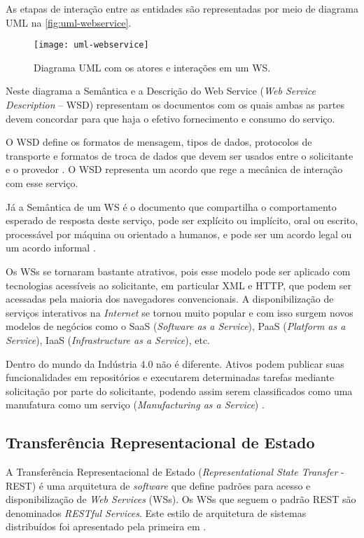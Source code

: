 As etapas de interação entre as entidades são representadas por meio de diagrama UML na \autoref{fig:uml-webservice}.

\begin{figure}[htb]
	\centering
	\texttt{[image: uml-webservice]}
	\caption{Diagrama UML com os atores e interações em um WS.}
	\label{fig:uml-webservice}
\end{figure}

Neste diagrama a Semântica e a Descrição do Web Service (\textit{Web Service Description} -- WSD) representam os documentos com os quais ambas as partes devem concordar para que haja o efetivo fornecimento e consumo do serviço.

O WSD define os formatos de mensagem, tipos de dados, protocolos de transporte e formatos de troca de dados que devem ser usados entre o solicitante e o provedor \cite{booth2004webservice}. O WSD representa um acordo que rege a mecânica de interação com esse serviço.

Já a Semântica de um WS é o documento que compartilha o comportamento esperado de resposta deste serviço, pode ser explícito ou implícito, oral ou escrito, processável por máquina ou orientado a humanos, e pode ser um acordo legal ou um acordo informal \cite{booth2004webservice}.

Os WSs se tornaram bastante atrativos, pois esse modelo pode ser aplicado com tecnologias acessíveis ao solicitante, em particular XML e HTTP, que podem ser acessadas pela maioria dos navegadores convencionais. A disponibilização de serviços interativos na \textit{Internet} se tornou muito popular e com isso surgem novos modelos de negócios como o SaaS (\textit{Software as a Service}), PaaS (\textit{Platform as a Service}), IaaS (\textit{Infrastructure as a Service}), etc.

Dentro do mundo da Indústria 4.0 não é diferente. Ativos podem publicar suas funcionalidades em repositórios e executarem determinadas tarefas mediante solicitação por parte do solicitante, podendo assim serem classificados como uma manufatura como um serviço (\textit{Manufacturing as a Service}) \cite{annunziata2019maas, nichols2020maas, siepen2019maas}.

\subsection{Transferência Representacional de Estado}

A Transferência Representacional de Estado (\textit{Representational State Transfer} - REST) é uma arquitetura de \textit{software} que define padrões para acesso e disponibilização de \textit{Web Services} (WSs). Os WSs que seguem o padrão REST são denominados \textit{RESTful Services}. Este estilo de arquitetura de sistemas distribuídos foi apresentado pela primeira em  .

